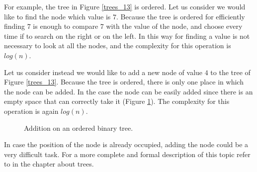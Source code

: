 For example, the tree in Figure \ref{trees_13} is ordered. Let us consider we would like to find the node which value is \(7\). Because the tree is ordered for efficiently finding \(7\) is enough to compare \(7\) with the value of the node, and choose every time if to search on the right or on the left. In this way for finding a value is not necessary to look at all the nodes, and the complexity for this operation is \(log(n)\).

Let us consider instead we would like to add a new node of value \(4\) to the tree of Figure \ref{trees_13}. Because the tree is ordered, there is only one place in which the node can be added. In the case the node can be easily added since there is an empty space that can correctly take it (Figure \ref{trees_14}). The complexity for this operation is again \(log(n)\).

\begin{figure}[H]
\centering
{}
\caption[Addition on an ordered binary tree.]{Addition on an ordered binary tree.}
\label{trees_14}
\end{figure}

In case the position of the node is already occupied, adding the node could be a very difficult task. For a more complete and formal description of this topic refer to \cite{goodrich2013data} in the chapter about trees.

